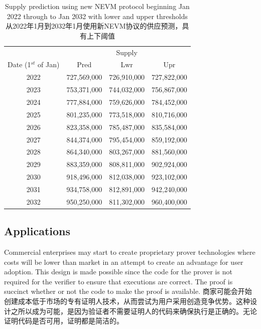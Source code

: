 \documentclass{ctexart}
\begin{document}
\begin{table}[h!]
\centering
\begin{tabular}{ |c|c|c|c| } 
\hline
 & \multicolumn{3}{|c|}{ Supply } \\
 Date (1$^{st}$ of Jan) & Pred & Lwr & Upr \\
\hline
2022 & 727,569,000 & 726,910,000 & 727,822,000 \\
2023 & 753,371,000 & 744,032,000 & 756,867,000 \\
2024 & 777,884,000 & 759,626,000 & 784,452,000 \\
2025 & 801,235,000  & 773,518,000 & 810,716,000 \\
2026 & 823,358,000  & 785,487,000 & 835,584,000 \\
2027 & 844,374,000 & 795,454,000 & 859,192,000 \\
2028 & 864,340,000 & 803,267,000 & 881,560,000 \\
2029 & 883,359,000 & 808,811,000 & 902,924,000 \\
2030 & 918,496,000 & 812,038,000 & 923,102,000 \\
2031 & 934,758,000 & 812,891,000 & 942,240,000 \\
2032 & 950,250,000 & 811,302,000 & 960,400,000 \\
\hline
\end{tabular}
\caption{Supply prediction using new NEVM protocol beginning Jan 2022 through to Jan 2032 with lower and upper thresholds 从2022年1月到2032年1月使用新NEVM协议的供应预测，具有上下阈值}
\label{table:pow_vs_pos}
\end{table}

\subsection{Applications}

Commercial enterprises may start to create proprietary prover technologies where costs will be lower than market in an attempt to create an advantage for user adoption. This design is made possible since the code for the prover is not required for the verifier to ensure that executions are correct. The proof is succinct whether or not the code to make the proof is available. 商家可能会开始创建成本低于市场的专有证明人技术，从而尝试为用户采用创造竞争优势。这种设计之所以成为可能，是因为验证者不需要证明人的代码来确保执行是正确的。无论证明代码是否可用，证明都是简洁的。
\end{document}

